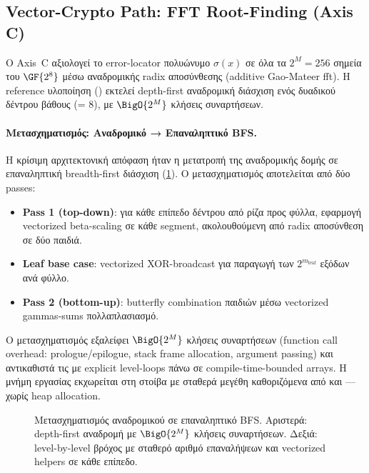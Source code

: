 \subsection{Vector-Crypto Path: \Zvbc FFT Root-Finding (Axis C)}
\label{sec:decode-zvbc-fft}

Ο Axis~C αξιολογεί το error-locator πολυώνυμο $\sigma(x)$ σε όλα τα
$2^M = 256$ σημεία του $\GF{2^8}$ μέσω αναδρομικής radix αποσύνθεσης
(additive Gao-Mateer \gls{fft}).  Η reference υλοποίηση ()
εκτελεί depth-first αναδρομική διάσχιση ενός δυαδικού δέντρου βάθους
 (= 8), με $\BigO{2^M}$ κλήσεις συναρτήσεων.

\paragraph{Μετασχηματισμός: Αναδρομικό → Επαναληπτικό BFS.}
Η κρίσιμη αρχιτεκτονική απόφαση ήταν η μετατροπή της αναδρομικής δομής
σε επαναληπτική breadth-first διάσχιση (\cref{fig:decode-fft-transform}).
Ο μετασχηματισμός αποτελείται από δύο passes:

\begin{itemize}
  \item \textbf{Pass 1 (top-down)}: για κάθε επίπεδο δέντρου από ρίζα
        προς φύλλα, εφαρμογή vectorized beta-scaling σε κάθε segment,
        ακολουθούμενη από radix αποσύνθεση σε δύο παιδιά.
  \item \textbf{Leaf base case}: vectorized XOR-broadcast για παραγωγή
        των $2^{m_{\text{leaf}}}$ εξόδων ανά φύλλο.
  \item \textbf{Pass 2 (bottom-up)}: butterfly combination παιδιών μέσω
        vectorized gammas-sums πολλαπλασιασμό.
\end{itemize}

Ο μετασχηματισμός εξαλείφει $\BigO{2^M}$ κλήσεις συναρτήσεων (function
call overhead: prologue/epilogue, stack frame allocation, argument passing)
και αντικαθιστά τις με explicit level-loops πάνω σε compile-time-bounded
arrays.  Η μνήμη εργασίας εκχωρείται στη στοίβα με σταθερά μεγέθη
καθοριζόμενα από  και  — χωρίς heap
allocation.

\begin{figure}[htbp]
  \centering
  
  \caption{Μετασχηματισμός αναδρομικού  σε επαναληπτικό BFS.
           Αριστερά: depth-first αναδρομή με $\BigO{2^M}$ κλήσεις
           συναρτήσεων.  Δεξιά: level-by-level βρόχος με σταθερό αριθμό
           επαναλήψεων και vectorized helpers σε κάθε επίπεδο.}
  \label{fig:decode-fft-transform}
\end{figure}

